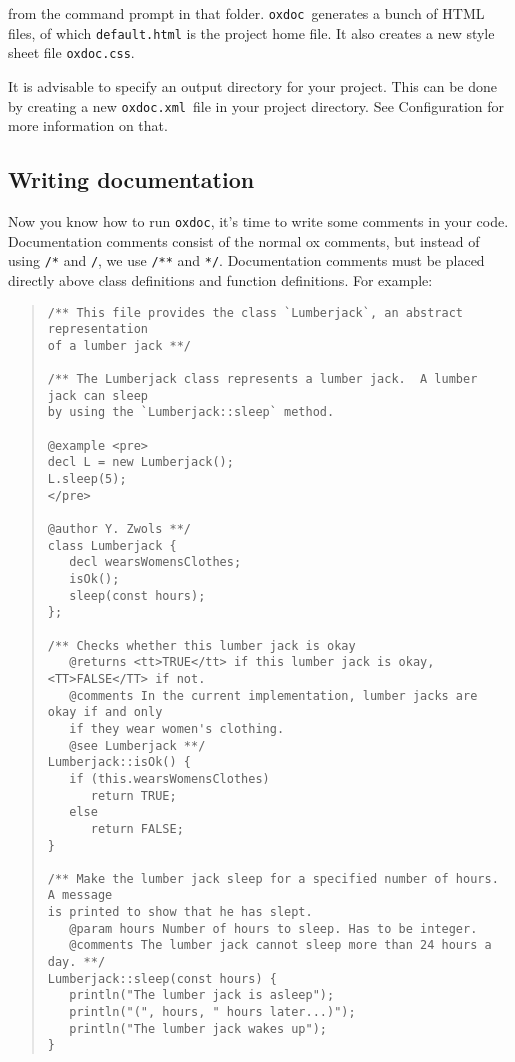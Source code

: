 \documentclass{article}
\newcommand\oxdoc{{\tt oxdoc}}
\newcommand\oxdocxml{{\tt oxdoc.xml}}
\begin{document}
from the command prompt in that folder. \oxdoc~generates a bunch
of HTML files, of which {\tt default.html} is the project home file. It also
creates a new style sheet file {\tt oxdoc.css}.

It is advisable to specify an output directory for your project. This can
be done by creating a new \oxdocxml~file in your project directory. See 
Configuration for more information on that.

\subsection{Writing documentation}
Now you know how to run \oxdoc, it's time to write some comments
in your code. Documentation comments consist of the normal ox comments,
but instead of using {\tt /*} and {\tt */}, we use
{\tt /**} and {\tt **/}. Documentation comments must be placed 
directly above class definitions and function definitions. For example:

\begin{quote}
\begin{verbatim}
/** This file provides the class `Lumberjack`, an abstract representation
of a lumber jack **/

/** The Lumberjack class represents a lumber jack.  A lumber jack can sleep
by using the `Lumberjack::sleep` method.

@example <pre>
decl L = new Lumberjack();
L.sleep(5);
</pre>

@author Y. Zwols **/
class Lumberjack {
   decl wearsWomensClothes;
   isOk();
   sleep(const hours);
};

/** Checks whether this lumber jack is okay
   @returns <tt>TRUE</tt> if this lumber jack is okay, <TT>FALSE</TT> if not.
   @comments In the current implementation, lumber jacks are okay if and only
   if they wear women's clothing.
   @see Lumberjack **/
Lumberjack::isOk() {
   if (this.wearsWomensClothes) 
      return TRUE;
   else
      return FALSE;
}

/** Make the lumber jack sleep for a specified number of hours. A message
is printed to show that he has slept.
   @param hours Number of hours to sleep. Has to be integer.
   @comments The lumber jack cannot sleep more than 24 hours a day. **/
Lumberjack::sleep(const hours) {
   println("The lumber jack is asleep");
   println("(", hours, " hours later...)");
   println("The lumber jack wakes up");
}
\end{verbatim}
\end{quote}
\end{document}
